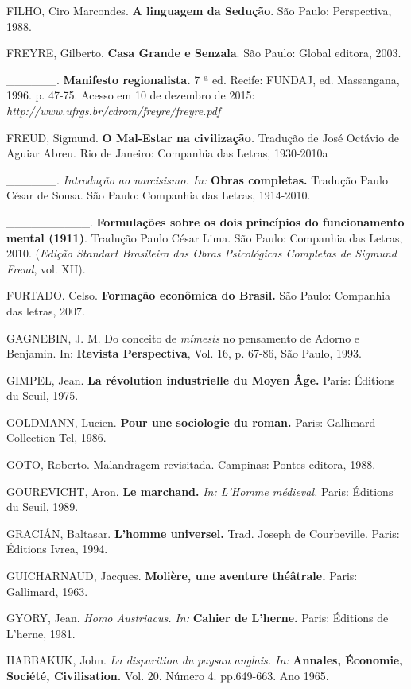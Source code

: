 FILHO, Ciro Marcondes. \textbf{A linguagem da Sedução}. São Paulo:
Perspectiva, 1988.

FREYRE, Gilberto. \textbf{Casa Grande e Senzala}. São Paulo: Global
editora, 2003.

\_\_\_\_\_\_. \textbf{Manifesto regionalista.} 7 ª ed. Recife: FUNDAJ,
ed. Massangana, 1996. p. 47-75. Acesso em 10 de dezembro de 2015:
\emph{http://www.ufrgs.br/cdrom/freyre/freyre.pdf}

FREUD, Sigmund. \textbf{O Mal-Estar na civilização}\emph{.} Tradução de
José Octávio de Aguiar Abreu. Rio de Janeiro: Companhia das Letras,
1930-2010a

\_\_\_\_\_\_. \emph{Introdução ao narcisismo. In:} \textbf{Obras
completas.} Tradução Paulo César de Sousa. São Paulo: Companhia das
Letras, 1914-2010.

\_\_\_\_\_\_\_\_\_\_. \textbf{Formulações sobre os dois princípios do
funcionamento mental (1911)}. Tradução Paulo César Lima. São Paulo:
Companhia das Letras, 2010. (\emph{Edição Standart Brasileira das Obras
Psicológicas Completas de Sigmund Freud}, vol. XII).

FURTADO. Celso. \textbf{Formação econômica do Brasil.} São Paulo:
Companhia das letras, 2007.

GAGNEBIN, J. M. Do conceito de \emph{mímesis} no pensamento de Adorno e
Benjamin. In: \textbf{Revista Perspectiva}, Vol. 16, p. 67-86, São
Paulo, 1993.

GIMPEL, Jean. \textbf{La révolution industrielle du Moyen Âge.} Paris:
Éditions du Seuil, 1975.

GOLDMANN, Lucien. \textbf{Pour une sociologie du roman.} Paris:
Gallimard-Collection Tel, 1986.

GOTO, Roberto. Malandragem revisitada. Campinas: Pontes editora, 1988.

GOUREVICHT, Aron. \textbf{Le marchand.} \emph{In: L'Homme médieval.}
Paris: Éditions du Seuil, 1989.

GRACIÁN, Baltasar. \textbf{L'homme universel.} Trad. Joseph de
Courbeville. Paris: Éditions Ivrea, 1994.

GUICHARNAUD, Jacques. \textbf{Molière, une aventure théâtrale.} Paris:
Gallimard, 1963.

GYORY, Jean. \emph{Homo Austriacus. In:} \textbf{Cahier de L'herne.}
Paris: Éditions de L'herne, 1981.

HABBAKUK, John. \emph{La disparition du paysan anglais. In:}
\textbf{Annales, Économie, Société, Civilisation.} Vol. 20. Número 4.
pp.649-663. Ano 1965.

